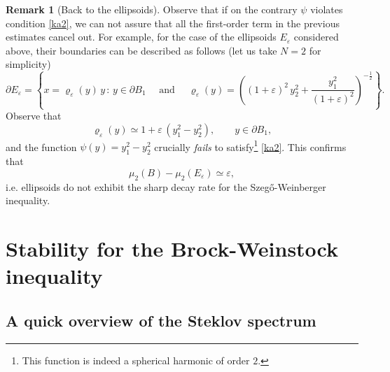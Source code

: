 \documentclass{amsart}
\theoremstyle{definition}
\newtheorem{remark}[lemma]{Remark}
\numberwithin{equation}{section}
\begin{document}
\begin{remark}[Back to the ellipsoids]
Observe that if on the contrary $\psi$ violates condition \eqref{ka2}, we can not assure that all the first-order term in the previous estimates cancel out. For example, for the case of the ellipsoids $E_\varepsilon$ considered above, their boundaries can be described as follows (let us take $N=2$ for simplicity)
\[
\partial E_\varepsilon=\left\{x=\varrho_\varepsilon(y)\,y\, :\, y\in\partial B_1\quad \mbox{ and }\quad \varrho_\varepsilon(y)=\left((1+\varepsilon)^2\,y_2^2+\frac{y_1^2}{(1+\varepsilon)^2}\right)^{-\frac{1}{2}}\right\}.
\]
Observe that 
\[
\varrho_\varepsilon(y)\simeq 1+\varepsilon\,(y_1^2-y_2^2),\qquad y\in\partial B_1,
\]
and the function $\psi(y)=y_1^2-y_2^2$ crucially {\it fails} to satisfy\footnote{This function is indeed a spherical harmonic of order $2$.} \eqref{ka2}. This confirms that
\[
\mu_2(B)-\mu_2(E_\varepsilon)\simeq \varepsilon,
\] 
i.e. ellipsoids do not exhibit the sharp decay rate for the Szeg\H{o}-Weinberger inequality.
\end{remark}


\section{Stability for the Brock-Weinstock inequality}
\label{sec:5}

\subsection{A quick overview of the Steklov spectrum}
\end{document}
